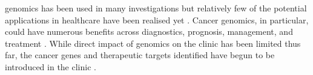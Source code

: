 \Glspl{genomic} has been used in many investigations \citep{Goodwin2016} but relatively few of the potential applications in healthcare have been realised yet \citep{Roychowdhury2016, Tran2012}. Cancer \glspl{genomic}, in particular, could have numerous benefits across diagnostics, prognosis, management, and treatment \citep{Roychowdhury2016}. %
\textcolor{For instance, patient outcome and quality of life could be more improved by more precise diagnosis of tumour subtype or tailored treatment based on molecular diagnosis, including targeted therapeutics with fewer adverse effects.} 
While direct impact of \glspl{genomic} on the clinic has been limited thus far, the \glspl{cancer gene} and therapeutic targets identified have begun to be introduced in the clinic \citep{Stratton2009}.



